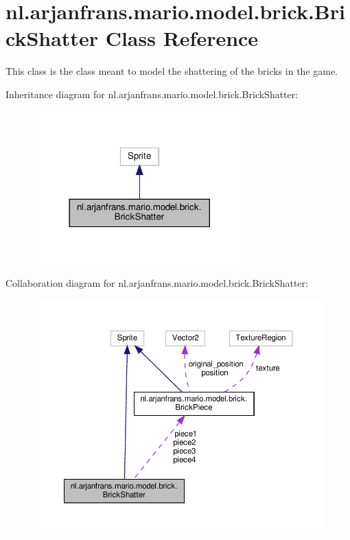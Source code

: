 \hypertarget{classnl_1_1arjanfrans_1_1mario_1_1model_1_1brick_1_1BrickShatter}{}\section{nl.\+arjanfrans.\+mario.\+model.\+brick.\+Brick\+Shatter Class Reference}
\label{classnl_1_1arjanfrans_1_1mario_1_1model_1_1brick_1_1BrickShatter}


This class is the class meant to model the shattering of the bricks in the game.  




Inheritance diagram for nl.\+arjanfrans.\+mario.\+model.\+brick.\+Brick\+Shatter\+:\nopagebreak
\begin{figure}[H]
\begin{center}
\leavevmode
\includegraphics[width=233pt]{classnl_1_1arjanfrans_1_1mario_1_1model_1_1brick_1_1BrickShatter__inherit__graph}
\end{center}
\end{figure}


Collaboration diagram for nl.\+arjanfrans.\+mario.\+model.\+brick.\+Brick\+Shatter\+:
\nopagebreak
\begin{figure}[H]
\begin{center}
\leavevmode
\includegraphics[width=350pt]{classnl_1_1arjanfrans_1_1mario_1_1model_1_1brick_1_1BrickShatter__coll__graph}
\end{center}
\end{figure}
